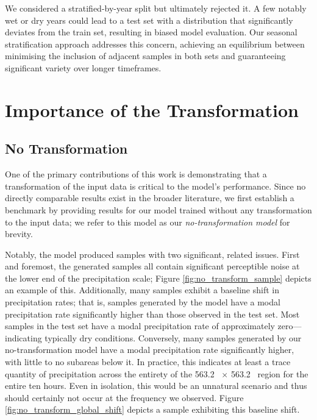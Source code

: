 \documentclass[ oneside,%
                    author={George Herbert},
                    degree={MSci},
                     title={Diffusion Models for Time-Evolving Precipitation Fields},
                  subtitle={}]{dissertation}
\begin{document}
We considered a stratified-by-year split but ultimately rejected it. A few notably wet or dry years could lead to a test set with a distribution that significantly deviates from the train set, resulting in biased model evaluation. Our seasonal stratification approach addresses this concern, achieving an equilibrium between minimising the inclusion of adjacent samples in both sets and guaranteeing significant variety over longer timeframes.

\section{Importance of the Transformation}
\label{sec:results_importance_of_transformation}

\subsection{No Transformation}
\label{sec:results_no_transformation}

One of the primary contributions of this work is demonstrating that a transformation of the input data is critical to the model's performance. Since no directly comparable results exist in the broader literature, we first establish a benchmark by providing results for our model trained without any transformation to the input data; we refer to this model as our \textit{no-transformation model} for brevity.

Notably, the model produced samples with two significant, related issues. First and foremost, the generated samples all contain significant perceptible noise at the lower end of the precipitation scale; Figure \ref{fig:no_transform_sample} depicts an example of this. Additionally, many samples exhibit a baseline shift in precipitation rates; that is, samples generated by the model have a modal precipitation rate significantly higher than those observed in the test set. Most samples in the test set have a modal precipitation rate of approximately zero---indicating typically dry conditions. Conversely, many samples generated by our no-transformation model have a modal precipitation rate significantly higher, with little to no subareas below it. In practice, this indicates at least a trace quantity of precipitation across the entirety of the 563.2\  $\times$ 563.2\  region for the entire ten hours. Even in isolation, this would be an unnatural scenario and thus should certainly not occur at the frequency we observed. Figure \ref{fig:no_transform_global_shift} depicts a sample exhibiting this baseline shift.
\end{document}

